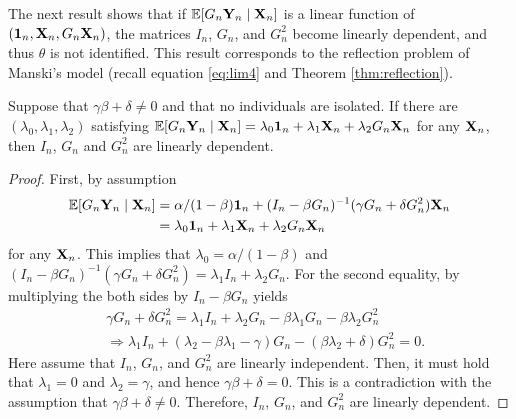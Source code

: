\documentclass[11pt, A4paper, openany, uplatex]{book}
\begin{document}
The next result shows that if $\mathbb{E}[G_n \mathbf{Y}_n \mid \mathbf{X}_n]$ is a linear function of $(\mathbf{1}_n, \mathbf{X}_n, G_n\mathbf{X}_n)$, the matrices $I_n$, $G_n$, and $G_n^2$ become linearly dependent, and thus $\theta$ is not identified.
This result corresponds to the reflection problem of Manski's model (recall equation \eqref{eq:lim4} and Theorem \ref{thm:reflection}).
\begin{proposition}
	Suppose that $\gamma \beta + \delta \neq 0$ and that no individuals are isolated.
	If there are $(\lambda_0, \lambda_1, \lambda_2)$ satisfying $\mathbb{E}[G_n \mathbf{Y}_n \mid \mathbf{X}_n] = \lambda_0\mathbf{1}_n + \lambda_1\mathbf{X}_n + \lambda_2 G_n \mathbf{X}_n$ for any $\mathbf{X}_n$, then $I_n$, $G_n$ and $G_n^2$ are linearly dependent.
\end{proposition}

\begin{proof}
	First, by assumption
	\begin{align*}
		\mathbb{E}[G_n \mathbf{Y}_n \mid \mathbf{X}_n] 
		& = \alpha/(1 - \beta) \mathbf{1}_n  + (I_n - \beta G_n)^{-1}( \gamma G_n + \delta G_n^2 ) \mathbf{X}_n\\
		& =  \lambda_0\mathbf{1}_n + \lambda_1\mathbf{X}_n + \lambda_2 G_n \mathbf{X}_n
	\end{align*}
	for any $\mathbf{X}_n$.
	This implies that $\lambda_0 = \alpha/(1 - \beta)$ and $(I_n - \beta G_n)^{-1}( \gamma G_n + \delta G_n^2 ) = \lambda_1 I_n + \lambda_2 G_n$.
	For the second equality, by multiplying the both sides by $I_n - \beta G_n$ yields
	\begin{align*}
		& \gamma G_n + \delta G_n^2  = \lambda_1 I_n + \lambda_2 G_n -  \beta \lambda_1 G_n - \beta \lambda_2 G_n^2 \\
		& \Longrightarrow \lambda_1 I_n + (\lambda_2 - \beta \lambda_1 - \gamma) G_n - (\beta \lambda_2 + \delta) G_n^2 = 0.
	\end{align*}
	Here assume that $I_n$, $G_n$, and $G_n^2$ are linearly independent.
	Then, it must hold that $\lambda_1 = 0$ and $\lambda_2 = \gamma$, and hence $\gamma \beta + \delta = 0$.
	This is a contradiction with the assumption that $\gamma \beta + \delta \neq 0$.
	Therefore, $I_n$, $G_n$, and $G_n^2$ are linearly dependent.
\end{proof}
\end{document}
